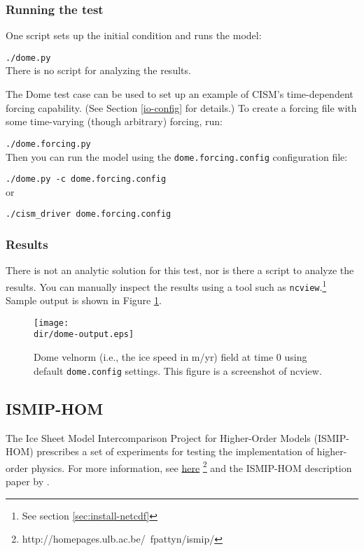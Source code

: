 \subsubsection{Running the test}
One script sets up the initial condition and runs the model:

\texttt{./dome.py}\\

\noindent
There is no script for analyzing the results.

\par
The Dome test case can be used to set up an example of CISM's time-dependent
forcing capability.  (See Section \ref{io-config} for details.)
To create a forcing file with some time-varying (though arbitrary) forcing, run:

\texttt{./dome.forcing.py}\\

\noindent
Then you can run the model using the \texttt{dome.forcing.config} configuration file:

\texttt{./dome.py -c dome.forcing.config}\\

\noindent
or

\texttt{./cism\_driver dome.forcing.config}\\

\subsubsection{Results}
There is not an analytic solution for this test, nor is there a script to analyze
the results.  You can manually inspect the results using a tool such as \texttt{ncview}.\footnote{See section \ref{sec:install-netcdf}}
Sample output is shown in Figure \ref{fig:domeresults}.
\begin{figure}[H!]
	\centering
	\texttt{[image: \\dir/dome-output.eps]}
	\caption{Dome velnorm (i.e., the ice speed in m/yr) field at time 0 using default \texttt{dome.config} settings. This figure is a screenshot of ncview.}
	\label{fig:domeresults}
\end{figure}
\FloatBarrier

\subsection{ISMIP-HOM}
The Ice Sheet Model Intercomparison Project for Higher-Order Models (ISMIP-HOM)
prescribes a set of experiments for testing the implementation of higher-order physics.  
For more information, see \href{http://homepages.ulb.ac.be/~fpattyn/ismip/}{here}
\footnote{http://homepages.ulb.ac.be/~fpattyn/ismip/} and the ISMIP-HOM description paper by \citet{Pattyn2008}.

